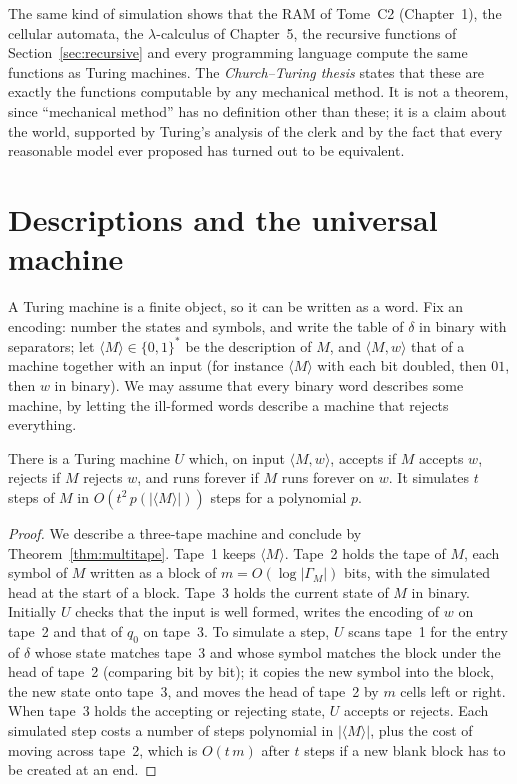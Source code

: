 The same kind of simulation shows that the RAM of Tome~C2 (Chapter~1), the cellular automata, the $\lambda$-calculus of Chapter~5, the recursive functions of Section~\ref{sec:recursive} and every programming language compute the same functions as Turing machines. The \emph{Church--Turing thesis} states that these are exactly the functions computable by any mechanical method. It is not a theorem, since ``mechanical method'' has no definition other than these; it is a claim about the world, supported by Turing's analysis of the clerk and by the fact that every reasonable model ever proposed has turned out to be equivalent.

\section{Descriptions and the universal machine}\label{sec:universal}

A Turing machine is a finite object, so it can be written as a word. Fix an encoding: number the states and symbols, and write the table of $\delta$ in binary with separators; let $\langle M\rangle\in\{0,1\}^*$ be the description of $M$, and $\langle M,w\rangle$ that of a machine together with an input (for instance $\langle M\rangle$ with each bit doubled, then $01$, then $w$ in binary). We may assume that every binary word describes some machine, by letting the ill-formed words describe a machine that rejects everything.

\begin{theorem}[Turing, 1936]\label{thm:universal}
There is a Turing machine $U$ which, on input $\langle M,w\rangle$, accepts if $M$ accepts $w$, rejects if $M$ rejects $w$, and runs forever if $M$ runs forever on $w$. It simulates $t$ steps of $M$ in $O(t^2\,p(|\langle M\rangle|))$ steps for a polynomial $p$.
\end{theorem}

\begin{proof}
We describe a three-tape machine and conclude by Theorem~\ref{thm:multitape}. Tape~1 keeps $\langle M\rangle$. Tape~2 holds the tape of $M$, each symbol of $M$ written as a block of $m=O(\log|\Gamma_M|)$ bits, with the simulated head at the start of a block. Tape~3 holds the current state of $M$ in binary. Initially $U$ checks that the input is well formed, writes the encoding of $w$ on tape~2 and that of $q_0$ on tape~3. To simulate a step, $U$ scans tape~1 for the entry of $\delta$ whose state matches tape~3 and whose symbol matches the block under the head of tape~2 (comparing bit by bit); it copies the new symbol into the block, the new state onto tape~3, and moves the head of tape~2 by $m$ cells left or right. When tape~3 holds the accepting or rejecting state, $U$ accepts or rejects. Each simulated step costs a number of steps polynomial in $|\langle M\rangle|$, plus the cost of moving across tape~2, which is $O(t\,m)$ after $t$ steps if a new blank block has to be created at an end.
\end{proof}

